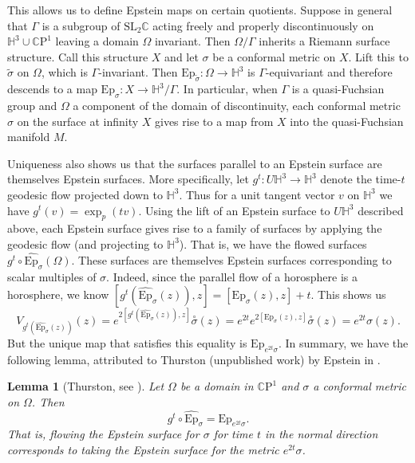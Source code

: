\documentclass{amsart}
\newcommand{\C}{\mathbb{C}}
\newcommand{\CP}{\mathbb{C}\mathrm{P}}
\renewcommand{\H}{\mathbb{H}}
\newtheorem{lem}[thm]{Lemma}
\begin{document}
This allows us to define Epstein maps on certain quotients. 
Suppose in general that $\Gamma$ is a subgroup of $\mathrm{SL}_2\C$ acting freely and properly discontinuously on $\H^3 \cup \CP^1$ leaving a domain $\Omega$ invariant. 
Then $\Omega/\Gamma$ inherits a Riemann surface structure. 
Call this structure $X$ and let $\sigma$ be a conformal metric  on $X$.
Lift this to $\tilde{\sigma}$ on $\Omega$, which is $\Gamma$-invariant. 
Then $\mathrm{Ep}_{\tilde{\sigma}}: \Omega \to \H^3$ is $\Gamma$-equivariant and therefore descends to a map $\mathrm{Ep}_\sigma : X \to \H^3/ \Gamma$. 
In particular, when $\Gamma$ is a quasi-Fuchsian group and $\Omega$ a component of the domain of discontinuity, each conformal metric $\sigma$ on the surface at infinity $X$ gives rise to a map from $X$ into the quasi-Fuchsian manifold $M$.

Uniqueness also shows us that the surfaces parallel to an Epstein surface are themselves Epstein surfaces. 
More specifically, let $g^t : U \H^3 \to \H^3$ denote the time-$t$ geodesic flow projected down to $\H^3$.
Thus for a unit tangent vector $v$ on $\H^3$ we have $g^t(v) = \exp_p(tv)$.
Using the lift of an Epstein surface to $U\H^3$ described above, each Epstein surface gives rise to a family of surfaces by applying the geodesic flow (and projecting to $\H^3$). 
That is, we have the flowed surfaces $g^t \circ \widehat{\mathrm{Ep}}_\sigma(\Omega)$. 
These surfaces are themselves Epstein surfaces corresponding to scalar multiples of $\sigma$. 
Indeed, since the parallel flow of a horosphere is a horosphere, we know $[g^t(\widehat{\mathrm{Ep}}_\sigma(z)),z] = [\mathrm{Ep}_\sigma(z),z] + t$. 
This shows us
\[
V_{g^t(\widehat{\mathrm{Ep}}_\sigma(z))}(z) = e^{2[g^t(\widehat{\mathrm{Ep}}_\sigma(z)),z]}\overset{\circ}{\sigma}(z) = e^{2t}e^{2[\mathrm{Ep}_\sigma(z),z]}\overset{\circ}{\sigma}(z) = e^{2t}\sigma(z).
\]
But the unique map that satisfies this equality is $\mathrm{Ep}_{e^{2t}\sigma}$. 
In summary, we have the following lemma, attributed to Thurston (unpublished work) by Epstein in \cite{epstein1984}.
\begin{lem}[Thurston, see \cite{epstein1984}]
\label{epstein-flow}
Let $\Omega$ be a domain in $\CP^1$ and $\sigma$ a conformal metric on $\Omega$.
Then 
\[
g^t \circ \widehat{\mathrm{Ep}}_\sigma  = \mathrm{Ep}_{e^{2t} \sigma}.
\]
That is, flowing the Epstein surface for $\sigma$ for time $t$ in the normal direction corresponds to taking the Epstein surface for the metric $e^{2t}\sigma$.
\end{lem}
\end{document}
